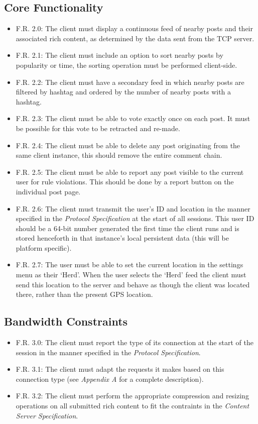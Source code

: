 \documentclass[12pt, a4paper]{article}
\begin{document}
\subsection{Core Functionality}
\begin{itemize}
\item F.R. 2.0: The client must display a continuous feed of nearby posts and their associated rich content, as determined by the data sent from the TCP server.
\item F.R. 2.1: The client must include an option to sort nearby posts by popularity or time, the sorting operation must be performed client-side.
\item F.R. 2.2: The client must have a secondary feed in which nearby posts are filtered by hashtag and ordered by the number of nearby posts with a hashtag.
\item F.R. 2.3: The client must be able to vote exactly once on each post. It must be possible for this vote to be retracted and re-made.
\item F.R. 2.4: The client must be able to delete any post originating from the same client instance, this should remove the entire comment chain.
\item F.R. 2.5: The client must be able to report any post visible to the current user for rule violations. This should be done by a report button on the individual post page.
\item F.R. 2.6: The client must transmit the user's ID and location in the manner specified in the \textit{Protocol Specification} at the start of all sessions. This user ID should be a 64-bit number generated the first time the client runs and is stored henceforth in that instance's local persistent data (this will be platform specific).
\item F.R. 2.7: The user must be able to set the current location in the settings menu as their `Herd'. When the user selects the `Herd' feed the client must send this location to the server and behave as though the client was located there, rather than the present GPS location. 
\end{itemize}
\subsection{Bandwidth Constraints}
\begin{itemize}
\item F.R. 3.0: The client must report the type of its connection at the start of the session in the manner specified in the \textit{Protocol Specification}.
\item F.R. 3.1: The client must adapt the requests it makes based on this connection type (see \textit{Appendix A} for a complete description).
\item F.R. 3.2: The client must perform the appropriate compression and resizing operations on all submitted rich content to fit the contraints in the \textit{Content Server Specification}.
\end{itemize}
\clearpage
\end{document}
